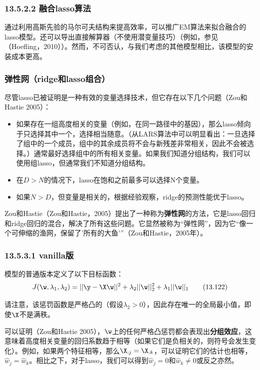 \documentclass[a4paper]{article}
\begin{document}
\subsubsection*{13.5.2.2 融合lasso算法}
通过利用高斯先验的马尔可夫结构来提高效率，可以推广EM算法来拟合融合的lasso模型。还可以导出直接解算器（不使用潜变量技巧）（例如，参见（Hoefling，2010））。然而，不可否认，与我们考虑的其他模型相比，该模型的安装成本更高。

\subsubsection{弹性网（ridge和lasso组合）}
尽管lasso已被证明是一种有效的变量选择技术，但它存在以下几个问题（Zou和Hastie 2005）：
\begin{itemize}
\item 如果存在一组高度相关的变量（例如，在同一路径中的基因），那么lasso倾向于只选择其中一个，选择相当随意。（从LARS算法中可以明显看出：一旦选择了组中的一个成员，组中的其余成员将不会与新残差非常相关，因此不会被选择。）通常最好选择组中的所有相关变量。如果我们知道分组结构，我们可以使用组lasso，但通常我们不知道分组结构。
\item 在$D>N$的情况下，lasso在饱和之前最多可以选择N个变量。
\item 如果$N>D$，但变量是相关的，根据经验观察，ridge的预测性能优于lasso。
\end{itemize}

Zou和Hastie（Zou和Hastie，2005）提出了一种称为\textbf{弹性网}的方法，它是lasso回归和ridge回归的混合，解决了所有这些问题。它显然被称为“弹性网”，因为它“像一个可伸缩的渔网，保留了'所有的大鱼'”（Zou和Hastie，2005年）。

\subsubsection*{13.5.3.1 vanilla版}
模型的普通版本定义了以下目标函数：
\begin{equation}
	J(\w,\lambda_1,\lambda_2)=||\y-\X\w||^2+\lambda_2||\w||_2^2+\lambda_1||\w||_1\tag{13.122}
\end{equation}

请注意，该惩罚函数是严格凸的（假设$\lambda_2>0$），因此存在唯一的全局最小值，即使$\X$不是满秩。

可以证明（Zou和Hastie 2005），$\w$上的任何严格凸惩罚都会表现出\textbf{分组效应}，这意味着高度相关变量的回归系数趋于相等（如果它们是负相关的，则符号会发生变化）。例如，如果两个特征相等，那么$\X_{:j}=\X_{:k}$，可以证明它们的估计也相等，$\hat{w}_j=\hat{w}_k$。相比之下，对于lasso，我们可以得到$\hat{w}_j=0$和$\hat{w}_k\ne 0$或反之亦然。
\end{document}
